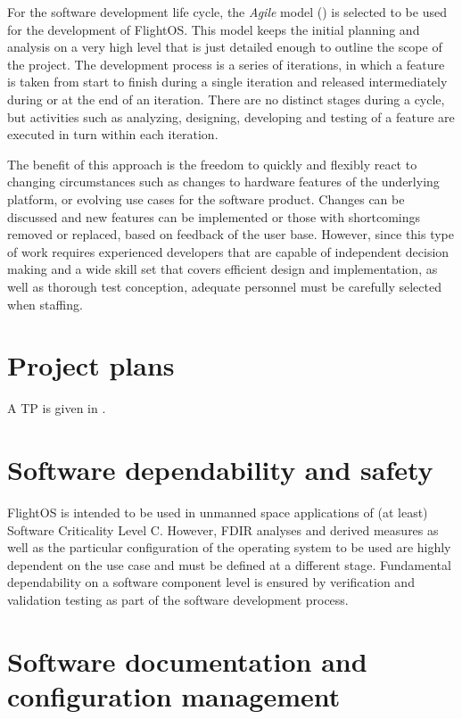 \noindent
For the software development life cycle, the \emph{Agile} model ()
is selected to be used for the development of FlightOS.
This model keeps the initial planning and analysis on a very high level that
is just detailed enough to outline the scope of the project. The development
process is a series of iterations, in which a feature is taken from start to
finish during a single iteration and released intermediately during or at the
end of an iteration.
There are no distinct stages during a cycle, but activities
such as analyzing, designing, developing and testing of a feature are executed
in turn within each iteration.

The benefit of this approach is the freedom to quickly and flexibly react to
changing circumstances such as changes to hardware features of the underlying
platform, or evolving use cases for the software product. Changes can be
discussed and new features can be implemented or those with shortcomings removed
or replaced, based on feedback of the user base.
However, since this type of
work requires experienced developers that are capable of independent decision
making and a wide skill set that covers efficient design and implementation, as
well as thorough test conception, adequate personnel must be carefully selected
when staffing.



\section{Project plans}

A \glsdesc{TP} is given in \cite{flightosTP}.


\section{Software dependability and safety}

FlightOS is intended to be used in unmanned space
applications of (at least) Software Criticality Level C. However, \gls{FDIR}
analyses and derived measures as well as the particular configuration of
the operating system to be used are highly dependent on the use case and must
be defined at a different stage. Fundamental dependability on a software
component level is ensured by verification and validation testing as part of the
software development process.


\section{Software documentation and configuration management}

